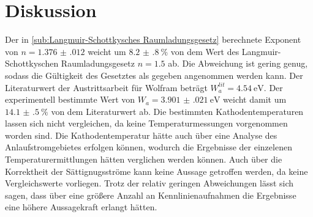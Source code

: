 \section{Diskussion}
\label{sec:Diskussion}

Der in \ref{sub:Langmuir-Schottkysches Raumladungsgesetz} berechnete Exponent von $n=\num{1.376(012)}$ weicht um $\SI{8.2(8)}{\percent}$ von dem Wert des Langmuir-Schottkyschen Raumladungsgesetz $n=\num{1.5}$ ab. Die Abweichung ist gering genug, sodass die Gültigkeit des Gesetztes als gegeben angenommen werden kann.
Der Literaturwert der Austrittsarbeit für Wolfram beträgt $W_a^{lit}=\SI{4.54}{\eV}$. Der experimentell bestimmte Wert von $W_a=\SI{3.901(021)}{\eV}$ weicht damit um $\SI{14.1(5)}{\percent}$ von dem Literaturwert ab. 
Die bestimmten Kathodentemperaturen lassen sich nicht vergleichen, da keine Temperaturmessungen vorgenommen worden sind. Die Kathodentemperatur hätte auch über eine Analyse des Anlaufstromgebietes erfolgen können, wodurch die Ergebnisse der einzelenen Temperaturermittlungen hätten verglichen werden können. Auch über die Korrektheit der Sättignugsströme kann keine Aussage getroffen werden, da keine Vergleichswerte vorliegen. Trotz der relativ geringen Abweichungen lässt sich sagen, dass über eine größere
Anzahl an Kennlinienaufnahmen die Ergebnisse eine höhere Aussagekraft erlangt hätten. 
